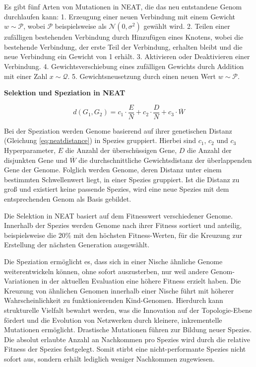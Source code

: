 Es gibt fünf Arten von Mutationen in NEAT, die das neu entstandene Genom durchlaufen kann:
1. Erzeugung einer neuen Verbindung mit einem Gewicht \(w \sim \mathcal{P}\), wobei \(\mathcal{P}\) beispielsweise als \(\mathcal{N}(0, \sigma^2)\) gewählt wird.
2. Teilen einer zufälligen bestehenden Verbindung durch Hinzufügen eines Knotens, wobei die bestehende Verbindung, der erste Teil der Verbindung, erhalten bleibt und die neue Verbindung ein Gewicht von 1 erhält.
3. Aktivieren oder Deaktivieren einer Verbindung.
4. Gewichtsverschiebung eines zufälligen Gewichts durch Addition mit einer Zahl \(x \sim \mathcal{Q}\).
5. Gewichtsneusetzung durch einen neuen Wert \(w \sim \mathcal{P}\).

\textbf{Selektion und Speziation in NEAT}

\begin{equation}
	d(G_1, G_2) = c_1 \cdot \frac{E}{N} + c_2 \cdot \frac{D}{N} + c_3 \cdot \overline{W}
	\label{eq:neatdistance}
\end{equation}

Bei der Speziation werden Genome basierend auf ihrer genetischen Distanz (Gleichung \ref{eq:neatdistance}) in Spezies gruppiert. Hierbei sind \(c_1\), \(c_2\) und  \(c_3\) Hyperparameter, \(E\) die Anzahl der überschüssigen Gene, \(D\) die Anzahl der disjunkten Gene und \(\overline{W}\) die durchschnittliche Gewichtsdistanz der überlappenden Gene der Genome. Folglich werden Genome, deren Distanz unter einem bestimmten Schwellenwert liegt, in einer Spezies gruppiert. Ist die Distanz zu groß und existiert keine passende Spezies, wird eine neue Spezies mit dem entsprechenden Genom als Basis gebildet.

Die Selektion in NEAT basiert auf dem Fitnesswert verschiedener Genome. Innerhalb der Spezies werden Genome nach ihrer Fitness sortiert und anteilig, beispielsweise die 20\% mit den höchsten Fitness-Werten, für die Kreuzung zur Erstellung der nächsten Generation ausgewählt.

Die Speziation ermöglicht es, dass sich in einer Nische ähnliche Genome weiterentwickeln können, ohne sofort auszusterben, nur weil andere Genom-Variationen in der aktuellen Evaluation eine höhere Fitness erzielt haben. Die Kreuzung von ähnlichen Genomen innerhalb einer Nische führt mit höherer Wahrscheinlichkeit zu funktionierenden Kind-Genomen. Hierdurch kann strukturelle Vielfalt bewahrt werden, was die Innovation auf der Topologie-Ebene fördert und die Evolution von Netzwerken durch kleinere, inkrementelle Mutationen ermöglicht. Drastische Mutationen führen zur Bildung neuer Spezies. Die absolut erlaubte Anzahl an Nachkommen pro Spezies wird durch die relative Fitness der Spezies festgelegt. Somit stirbt eine nicht-performante Spezies nicht sofort aus, sondern erhält lediglich weniger Nachkommen zugewiesen.

